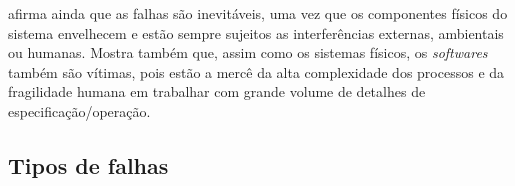  afirma ainda que as falhas são inevitáveis, uma vez que
os componentes físicos do sistema envelhecem e estão sempre sujeitos as
interferências externas, ambientais ou humanas. Mostra também que, assim como os
sistemas físicos, os {\it softwares} também são vítimas, pois estão a mercê da
alta complexidade dos processos e da fragilidade humana em trabalhar com grande
volume de detalhes de especificação/operação.

\subsection{Tipos de falhas}

